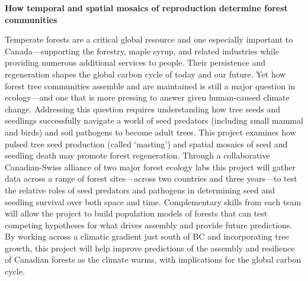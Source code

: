 \documentclass[12pt,oneside]{article}
\begin{document}


\thispagestyle{empty}
\begin{center}
{\bf How temporal and spatial mosaics of reproduction determine forest communities} 
\vspace{-1ex}
\end{center}

Temperate forests are a critical global resource and one especially important to Canada---supporting the forestry, maple syrup, and related industries while providing numerous additional services to people. Their persistence and regeneration shapes the global carbon cycle of today and our future. Yet how forest tree communities assemble and are maintained is still a major question in ecology---and one that is more pressing to answer given human-caused climate change. Addressing this question requires understanding how tree seeds and seedlings successfully navigate a world of seed predators (including small mammal and birds) and soil pathogens to become adult trees. This project examines how pulsed tree seed production (called `masting') and spatial mosaics of seed and seedling death may promote forest regeneration. Through a collaborative Canadian-Swiss alliance of two major forest ecology labs this project will gather data across a range of forest sites---across two countries and three years---to test the relative roles of seed predators and pathogens in determining seed and seedling survival over both space and time. Complementary skills from each team will allow the project to build population models of forests that can test competing hypotheses for what drives assembly and provide future predictions. By working across a climatic gradient just south of BC and incorporating tree growth, this project will help improve predictions of the assembly and resilience of Canadian forests as the climate warms, with implications for the global carbon cycle. 
\end{document}
